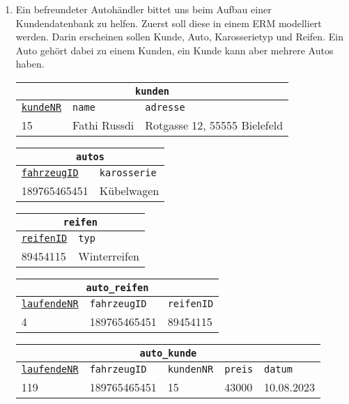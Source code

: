\begin{Answer}[ref=TabelleErstellen1]
\begin{enumerate}
        \medskip

		\item Ein befreundeter Autohändler bittet uns beim Aufbau einer Kundendatenbank zu helfen. Zuerst soll diese in einem ERM modelliert werden. Darin erscheinen sollen Kunde, Auto, Karosserietyp und Reifen. Ein Auto gehört dabei zu einem Kunden, ein Kunde kann aber mehrere Autos haben.

		\begin{tabular}{lll}
			\multicolumn{3}{c}{\lstinline!kunden!}\\
			\hline
			\underline{\lstinline!kundeNR!}&\lstinline!name!&\lstinline!adresse!\\
			\hline
			15&Fathi Russdi&Rotgasse 12, 55555 Bielefeld\\
		\end{tabular}

        \medskip

		\begin{tabular}{ll}
			\multicolumn{2}{c}{\lstinline!autos!}\\
			\hline
			\underline{\lstinline!fahrzeugID!}&\lstinline!karosserie!\\
			\hline
			189765465451&Kübelwagen\\
		\end{tabular}

        \medskip

		\begin{tabular}{ll}
			\multicolumn{2}{c}{\lstinline!reifen!}\\
			\hline
			\underline{\lstinline!reifenID!}&\lstinline!typ!\\
			\hline
			89454115&Winterreifen\\
		\end{tabular}

        \medskip

		\begin{tabular}{lll}
			\multicolumn{3}{c}{\lstinline!auto_reifen!}\\
			\hline
			\underline{\lstinline!laufendeNR!}&\lstinline!fahrzeugID!&\lstinline!reifenID!\\
			\hline
			4&189765465451&89454115\\
		\end{tabular}

        \medskip

		\begin{tabular}{lllll}
			\multicolumn{5}{c}{\lstinline!auto_kunde!}\\
			\hline
			\underline{\lstinline!laufendeNR!}&\lstinline!fahrzeugID!&\lstinline!kundenNR!&\lstinline!preis!&\lstinline!datum!\\
			\hline
			119&189765465451&15&43000&10.08.2023\\
		\end{tabular}


\end{enumerate}
\end{Answer}
